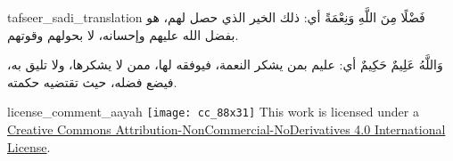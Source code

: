 \begin{taggedblock}{tafseer_sadi_translation}
{ فَضْلًا مِنَ اللَّهِ وَنِعْمَةً }
أي: ذلك الخير الذي حصل لهم، هو بفضل الله عليهم وإحسانه، لا بحولهم وقوتهم.

{ وَاللَّهُ عَلِيمٌ حَكِيمٌ }
أي: عليم بمن يشكر النعمة، فيوفقه لها، ممن لا يشكرها، ولا تليق به، فيضع فضله، حيث تقتضيه حكمته.
\end{taggedblock}
\begin{taggedblock}{license_comment_aayah}
\texttt{[image: cc\_88x31]}
This work is licensed under a 
\href{http://creativecommons.org/licenses/by-nc-nd/4.0/}{Creative Commons Attribution-NonCommercial-NoDerivatives 4.0 International License}.
\end{taggedblock}
\begin{comment}
Please use the following for footnotes:- Sample\footnoteQ{Text of Qur'an footnote goes here.}.
Sample\footnoteT{Text of Tafseer footnote goes here.}.
\end{comment}